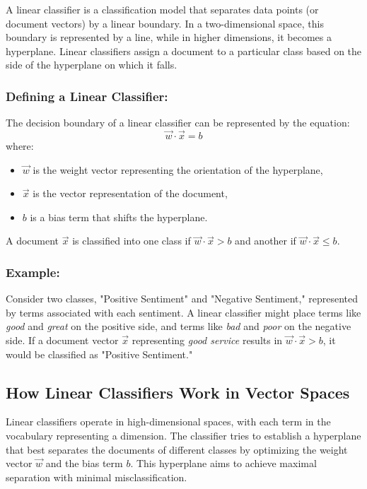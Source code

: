 \documentclass{article}
\begin{document}
A linear classifier is a classification model that separates data points (or document vectors) by a linear boundary. In a two-dimensional space, this boundary is represented by a line, while in higher dimensions, it becomes a hyperplane. Linear classifiers assign a document to a particular class based on the side of the hyperplane on which it falls.

\subsubsection*{Defining a Linear Classifier:}
The decision boundary of a linear classifier can be represented by the equation:
\[
\vec{w} \cdot \vec{x} = b
\]
where:
\begin{itemize}
    \item \(\vec{w}\) is the weight vector representing the orientation of the hyperplane,
    \item \(\vec{x}\) is the vector representation of the document,
    \item \(b\) is a bias term that shifts the hyperplane.
\end{itemize}

A document \(\vec{x}\) is classified into one class if \(\vec{w} \cdot \vec{x} > b\) and another if \(\vec{w} \cdot \vec{x} \leq b\).

\subsubsection*{Example:}
Consider two classes, "Positive Sentiment" and "Negative Sentiment," represented by terms associated with each sentiment. A linear classifier might place terms like \textit{good} and \textit{great} on the positive side, and terms like \textit{bad} and \textit{poor} on the negative side. If a document vector \(\vec{x}\) representing \textit{good service} results in \(\vec{w} \cdot \vec{x} > b\), it would be classified as "Positive Sentiment."

\subsection{How Linear Classifiers Work in Vector Spaces}

Linear classifiers operate in high-dimensional spaces, with each term in the vocabulary representing a dimension. The classifier tries to establish a hyperplane that best separates the documents of different classes by optimizing the weight vector \(\vec{w}\) and the bias term \(b\). This hyperplane aims to achieve maximal separation with minimal misclassification.
\end{document}
